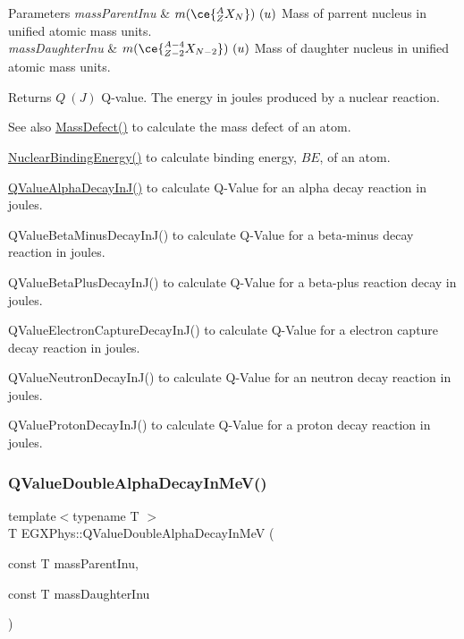 \begin{DoxyParams}{Parameters}
{\em mass\+Parent\+Inu} & $m(\ce{ ^{A}_{Z}X_{N} })\ (u)$ Mass of parrent nucleus in unified atomic mass units. \\
\hline
{\em mass\+Daughter\+Inu} & $m(\ce{ ^{A-4}_{Z-2}X_{N-2} })\ (u)$ Mass of daughter nucleus in unified atomic mass units. \\
\hline
\end{DoxyParams}
\begin{DoxyReturn}{Returns}
$Q\ (J)$ Q-\/value. The energy in joules produced by a nuclear reaction. 
\end{DoxyReturn}
\begin{DoxySeeAlso}{See also}
\mbox{\hyperlink{group___e_g_x_phys-_mass_defect_gae89f2dfa65992c0314adc2440b2f582a}{Mass\+Defect()}} to calculate the mass defect of an atom. 

\mbox{\hyperlink{group___e_g_x_phys-_nuclear_binding_energy_gab6832bf15ead7b4e867e759e0a2a078e}{Nuclear\+Binding\+Energy()}} to calculate binding energy, $BE$, of an atom. 

\mbox{\hyperlink{_q_value_8hpp_ab8a50c18f6de3c1b6ed280c26c3ff3a5}{Q\+Value\+Alpha\+Decay\+In\+J()}} to calculate Q-\/\+Value for an alpha decay reaction in joules. 

Q\+Value\+Beta\+Minus\+Decay\+In\+J() to calculate Q-\/\+Value for a beta-\/minus decay reaction in joules. 

Q\+Value\+Beta\+Plus\+Decay\+In\+J() to calculate Q-\/\+Value for a beta-\/plus reaction decay in joules. 

Q\+Value\+Electron\+Capture\+Decay\+In\+J() to calculate Q-\/\+Value for a electron capture decay reaction in joules. 

Q\+Value\+Neutron\+Decay\+In\+J() to calculate Q-\/\+Value for an neutron decay reaction in joules. 

Q\+Value\+Proton\+Decay\+In\+J() to calculate Q-\/\+Value for a proton decay reaction in joules. 
\end{DoxySeeAlso}
\mbox{\label{_q_value_8hpp_file_a85230c793adc7fc78fef760874f75ad9}} 
\subsubsection{\texorpdfstring{Q\+Value\+Double\+Alpha\+Decay\+In\+Me\+V()}{QValueDoubleAlphaDecayInMeV()}}
{\footnotesize\ttfamily template$<$typename T $>$ \\
T E\+G\+X\+Phys\+::\+Q\+Value\+Double\+Alpha\+Decay\+In\+MeV (\begin{DoxyParamCaption}\item[{const T}]{mass\+Parent\+Inu,  }\item[{const T}]{mass\+Daughter\+Inu }\end{DoxyParamCaption})}



